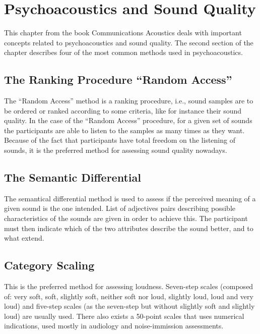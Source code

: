 \section{Psychoacoustics and Sound Quality}

This chapter from the book Communications Acoustics
\cite{Blauert2005Communication} deals with important concepts related to
psychoacoustics and sound quality. The second section of the chapter describes
four of the most common methods used in psychoacoustics.

\subsection{The Ranking Procedure ``Random Access''}

The ``Random Access'' method is a ranking procedure, i.e., sound samples are to
be ordered or ranked according to some criteria, like for instance their sound
quality. In the case of the ``Random Access'' procedure, for a given set of
sounds the participants are able to listen to the samples as many times as they
want. Because of the fact that participants have total freedom on the listening
of sounds, it is the preferred method for assessing sound quality nowadays.

\subsection{The Semantic Differential}

The semantical differential method is used to assess if the perceived meaning of
a given sound is the one intended. List of adjectives pairs describing possible
characteristics of the sounds are given in order to achieve this. The
participant must then indicate which of the two attributes describe the sound
better, and to what extend.

\subsection{Category Scaling} 

This is the preferred method for assessing loudness. Seven-step scales (composed
of: very soft, soft, slightly soft, neither soft nor loud, slightly loud, loud
and very loud) and five-step scales (as the seven-step but without slightly soft
and slightly loud) are usually used. There also exists a 50-point scales that
uses numerical indications, used mostly in audiology and noise-immission
assessments.

